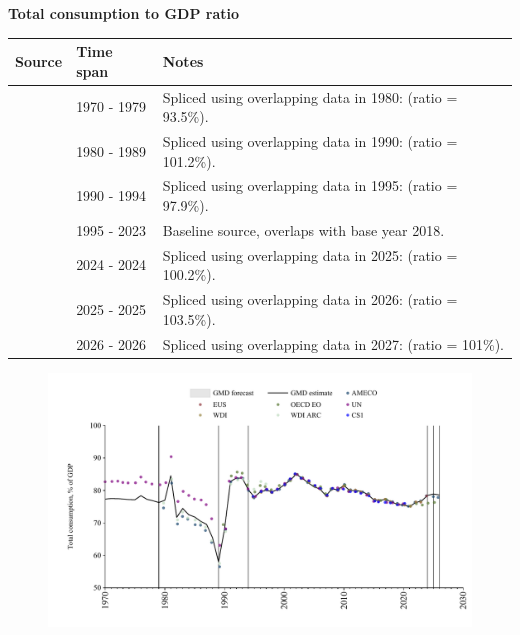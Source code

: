\documentclass[12pt,a4paper,landscape]{article}
\begin{document}
\begin{adjustbox}{max totalsize={\paperwidth}{\paperheight},center}
\begin{minipage}[t][\textheight][t]{\textwidth}
\vspace*{0.5cm}
{}
\begin{center}
{\Large\bfseries Total consumption to GDP ratio}
\end{center}
\vspace{0.5cm}
\begin{table}[H]
\centering
\small
\begin{tabular}{|l|l|l|}
\hline
\textbf{Source} & \textbf{Time span} & \textbf{Notes} \\
\hline
\rowcolor{white}\cite{UN}& 1970 - 1979 &Spliced using overlapping data in 1980: (ratio = 93.5\%). \\
\rowcolor{lightgray}\cite{WDI_ARC}& 1980 - 1989 &Spliced using overlapping data in 1990: (ratio = 101.2\%). \\
\rowcolor{white}\cite{OECD_EO}& 1990 - 1994 &Spliced using overlapping data in 1995: (ratio = 97.9\%). \\
\rowcolor{lightgray}\cite{WDI}& 1995 - 2023 &Baseline source, overlaps with base year 2018. \\
\rowcolor{white}\cite{EUS}& 2024 - 2024 &Spliced using overlapping data in 2025: (ratio = 100.2\%). \\
\rowcolor{lightgray}\cite{OECD_EO}& 2025 - 2025 &Spliced using overlapping data in 2026: (ratio = 103.5\%). \\
\rowcolor{white}\cite{AMECO}& 2026 - 2026 &Spliced using overlapping data in 2027: (ratio = 101\%). \\
\hline
\end{tabular}
\end{table}
\begin{figure}[H]
\centering
\includegraphics[width=\textwidth,height=0.6\textheight,keepaspectratio]{graphs/POL_cons_GDP.pdf}
\end{figure}
\end{minipage}
\end{adjustbox}
\end{document}
